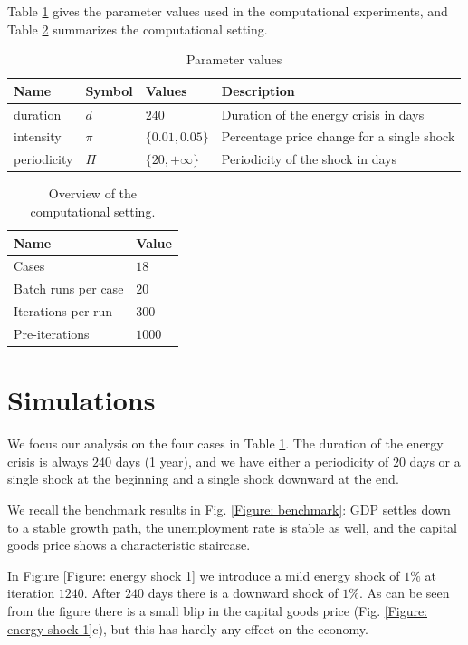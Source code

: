 Table \ref{Table: parameter settings} gives the parameter values used in the
computational experiments, and Table \ref{Table: computational setting} summarizes the computational
setting.

\begin{table}[tbp]
\caption{Parameter values}
\centering
\begin{tabular}{llll}
\hline\hline
Name & Symbol & Values & Description \\ \hline
duration & $d$ & $240$ & Duration of the energy crisis in days \\
intensity & $\pi$ & $\{0.01, 0.05\}$ & Percentage price change for a
single shock \\
periodicity & $\Pi$ & $\{20, +\infty\}$ & Periodicity of the shock in days%
\end{tabular}%
\label{Table: parameter settings}
\end{table}

\begin{table}[tbp]
\caption{Overview of the computational setting.}
\label{Table: computational setting}
\centering
\begin{tabular}{ll}
\hline\hline
Name & Value \\ \hline
Cases & $18$ \\
Batch runs per case & $20$ \\
Iterations per run & $300$ \\
Pre-iterations & $1000$ \\ \hline
\end{tabular}%
\end{table}

\section{Simulations}
We focus our analysis on the four cases in Table \ref{Table: parameter settings}.
The duration of the energy crisis is always $240$ days (1 year), and we
have either a periodicity of $20$ days or a single shock at the beginning and a single shock downward at the end.

We recall the benchmark results in Fig. \ref{Figure: benchmark}: GDP settles down to a stable growth path, the unemployment rate is stable as well, and the capital goods price shows a characteristic staircase.

In Figure \ref{Figure: energy shock 1} we introduce a mild energy shock of $1\%$ at iteration $1240$.
After $240$ days there is a downward shock of $1\%$. As can be seen from the figure there is a small blip in the capital goods price (Fig. \ref{Figure: energy shock 1}c), but this has hardly any effect on the economy.

